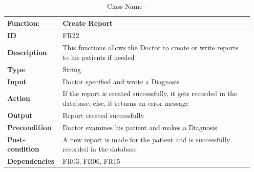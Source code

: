\documentclass[]{article}
\begin{document}
\FloatBarrier
\begin{table}[h]
\caption{Class Name - }
\label{tab:my-table}
\begin{tabular}{|p{}|p{}|}
\hline
\textbf{Function:} & Create Report
\\ \hline
\textbf{ID}  & FR22           

\\ \hline
\textbf{Description}    & This functions allows the Doctor to create or write reports to his patients if needed                                                                    
\\ \hline
\textbf{Type}    & String         

\\ \hline
\textbf{Input}        & Doctor specified and wrote a Diagnosis

\\ \hline
\textbf{Action}            & If the report is created successfully, it gets recorded in the database. else, it returns an error message  

\\ \hline
\textbf{Output}            & Report created successfully

\\ \hline
\textbf{Precondition}           & Doctor examines his patient and makes a Diagnosis

\\ \hline
\textbf{Post-condition}           & A new report is made for the patient and is successfully recorded in the database


\\ \hline
\textbf{Dependencies}           & FR03, FR06, FR15
\\ \hline
\end{tabular}
\end{table}
\end{document}
